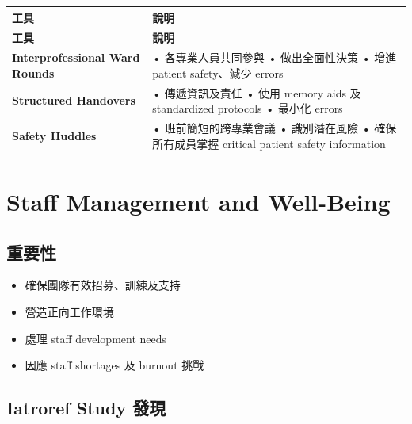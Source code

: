 \documentclass[12pt,a4paper]{article}
\begin{document}
\begin{longtable}{p{4cm}p{10cm}}
\toprule
\textbf{工具} & \textbf{說明} \\
\midrule
\endfirsthead

\toprule
\textbf{工具} & \textbf{說明} \\
\midrule
\endhead

\bottomrule
\endfoot

\textbf{Interprofessional Ward Rounds} &
• 各專業人員共同參與\newline
• 做出全面性決策\newline
• 增進 patient safety、減少 errors \\
\midrule
\textbf{Structured Handovers} &
• 傳遞資訊及責任\newline
• 使用 memory aids 及 standardized protocols\newline
• 最小化 errors \\
\midrule
\textbf{Safety Huddles} &
• 班前簡短的跨專業會議\newline
• 識別潛在風險\newline
• 確保所有成員掌握 critical patient safety information \\
\bottomrule
\end{longtable}

\section{Staff Management and Well-Being}

\subsection{重要性}

\begin{itemize}
    \item 確保團隊有效招募、訓練及支持
    \item 營造正向工作環境
    \item 處理 staff development needs
    \item 因應 staff shortages 及 burnout 挑戰
\end{itemize}

\subsection{Iatroref Study 發現}

\end{document}
